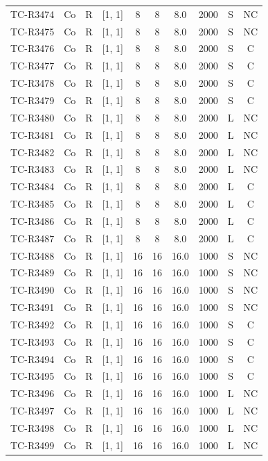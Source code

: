 \begin{longtable}{lccccccccc}
TC-R3474 & Co & R & [1, 1] & 8 & 8 & 8.0 & 2000 & S & NC \\
TC-R3475 & Co & R & [1, 1] & 8 & 8 & 8.0 & 2000 & S & NC \\
TC-R3476 & Co & R & [1, 1] & 8 & 8 & 8.0 & 2000 & S & C \\
TC-R3477 & Co & R & [1, 1] & 8 & 8 & 8.0 & 2000 & S & C \\
TC-R3478 & Co & R & [1, 1] & 8 & 8 & 8.0 & 2000 & S & C \\
TC-R3479 & Co & R & [1, 1] & 8 & 8 & 8.0 & 2000 & S & C \\
TC-R3480 & Co & R & [1, 1] & 8 & 8 & 8.0 & 2000 & L & NC \\
TC-R3481 & Co & R & [1, 1] & 8 & 8 & 8.0 & 2000 & L & NC \\
TC-R3482 & Co & R & [1, 1] & 8 & 8 & 8.0 & 2000 & L & NC \\
TC-R3483 & Co & R & [1, 1] & 8 & 8 & 8.0 & 2000 & L & NC \\
TC-R3484 & Co & R & [1, 1] & 8 & 8 & 8.0 & 2000 & L & C \\
TC-R3485 & Co & R & [1, 1] & 8 & 8 & 8.0 & 2000 & L & C \\
TC-R3486 & Co & R & [1, 1] & 8 & 8 & 8.0 & 2000 & L & C \\
TC-R3487 & Co & R & [1, 1] & 8 & 8 & 8.0 & 2000 & L & C \\
TC-R3488 & Co & R & [1, 1] & 16 & 16 & 16.0 & 1000 & S & NC \\
TC-R3489 & Co & R & [1, 1] & 16 & 16 & 16.0 & 1000 & S & NC \\
TC-R3490 & Co & R & [1, 1] & 16 & 16 & 16.0 & 1000 & S & NC \\
TC-R3491 & Co & R & [1, 1] & 16 & 16 & 16.0 & 1000 & S & NC \\
TC-R3492 & Co & R & [1, 1] & 16 & 16 & 16.0 & 1000 & S & C \\
TC-R3493 & Co & R & [1, 1] & 16 & 16 & 16.0 & 1000 & S & C \\
TC-R3494 & Co & R & [1, 1] & 16 & 16 & 16.0 & 1000 & S & C \\
TC-R3495 & Co & R & [1, 1] & 16 & 16 & 16.0 & 1000 & S & C \\
TC-R3496 & Co & R & [1, 1] & 16 & 16 & 16.0 & 1000 & L & NC \\
TC-R3497 & Co & R & [1, 1] & 16 & 16 & 16.0 & 1000 & L & NC \\
TC-R3498 & Co & R & [1, 1] & 16 & 16 & 16.0 & 1000 & L & NC \\
TC-R3499 & Co & R & [1, 1] & 16 & 16 & 16.0 & 1000 & L & NC \\

\end{longtable}
